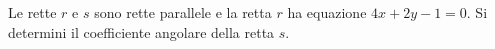 Le rette \(\displaystyle r\) e \(\displaystyle s\) sono rette parallele e la retta \(\displaystyle r\) ha equazione 
\(\displaystyle 4x+2y-1 = 0\). 
Si determini il coefficiente angolare della retta \(\displaystyle s\).
